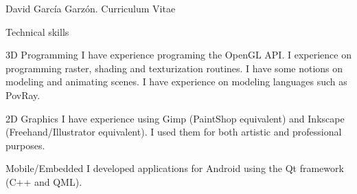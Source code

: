 \documentclass{article}
\begin{document}
\begin{cv}{David García Garzón. Curriculum Vitae}
\begin{cvlist}{Technical skills}
\item[3D Programming]
	I have experience programing the OpenGL API. I experience on programming raster, shading and texturization routines. I have some notions on modeling and animating scenes. I have experience on modeling languages such as PovRay. 

\item[2D Graphics]
	I have experience using Gimp (PaintShop equivalent) and Inkscape (Freehand/Illustrator equivalent). I used them for both artistic and professional purposes. 

\item[Mobile/Embedded]
	I developed applications for Android using the Qt framework (C++ and QML). 

\end{cvlist}


\end{cv}
\end{document}
